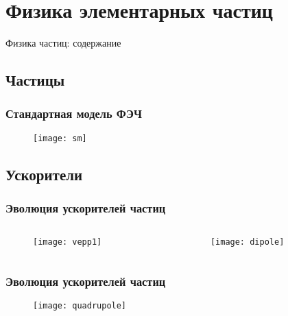 \section{Физика элементарных частиц}
\begin{frame}{Физика частиц: содержание}
    \tableofcontents[currentsection, subsectionstyle=show/show/hide]
\end{frame}
\subsection{Частицы}
\begin{frame}
    \frametitle{Стандартная модель ФЭЧ}
    \begin{figure}
        \begin{centering}
            \texttt{[image: sm]}
        \end{centering}
    \end{figure}
\end{frame}

\subsection{Ускорители}
\begin{frame}
    \frametitle{Эволюция ускорителей частиц}
    \begin{columns}
        \begin{column}{0.5\textwidth}
            \begin{figure}
                \begin{centering}
                    \texttt{[image: vepp1]}
                \end{centering}
            \end{figure}
        \end{column}
        \begin{column}{0.5\textwidth}
            \begin{figure}
                \begin{centering}
                    \texttt{[image: dipole]}
                \end{centering}
            \end{figure}
        \end{column}
    \end{columns}
\end{frame}


\begin{frame}
    \frametitle{Эволюция ускорителей частиц}
    \begin{figure}
        \begin{centering}
            \texttt{[image: quadrupole]}
        \end{centering}
    \end{figure}
\end{frame}

